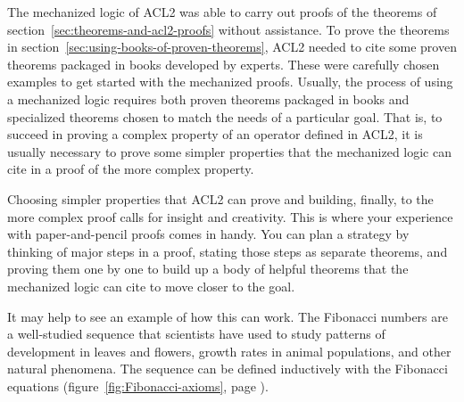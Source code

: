 The mechanized logic of ACL2 was able to carry out proofs of
the theorems of section~\ref{sec:theorems-and-acl2-proofs} without assistance.
To prove the theorems in section~\ref{sec:using-books-of-proven-theorems},
ACL2 needed to cite some proven theorems packaged in books
developed by experts.
These were carefully chosen examples to get started with
the mechanized proofs.
Usually, the process of using a mechanized logic requires
both proven theorems packaged in books
and specialized theorems chosen to match the
needs of a particular goal.
That is, to succeed in proving a complex property of
an operator defined in ACL2,
it is usually necessary to prove
some simpler properties that the mechanized
logic can cite in a proof of the more complex property.

Choosing simpler properties that ACL2 can prove
and building, finally, to the more complex proof
calls for insight and creativity.
This is where your experience with paper-and-pencil proofs
comes in handy.
You can plan a strategy by thinking of major steps
in a proof, stating those steps as separate theorems,
and proving them one by one to build up a body
of helpful theorems that the mechanized logic
can cite to move closer to the goal.

It may help to see an example of how this can work.
The Fibonacci numbers are a well-studied sequence that
scientists have used to study
patterns of development in leaves and flowers,
growth rates in animal populations,
and other natural phenomena.
The sequence can be defined inductively
with the Fibonacci equations
(figure~\ref{fig:Fibonacci-axioms}, page \pageref{fig:Fibonacci-axioms}).

